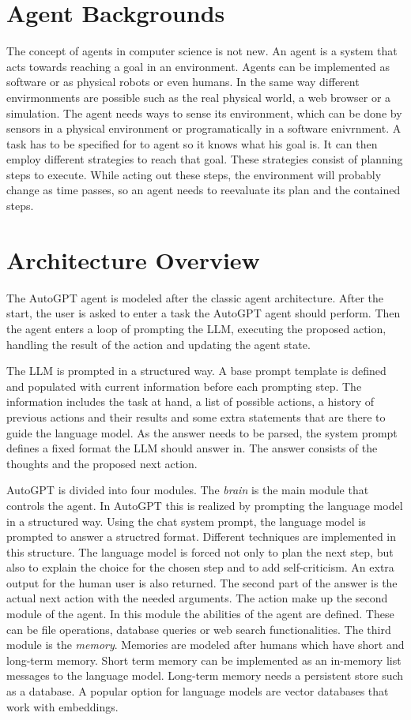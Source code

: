 \documentclass[english, version-2022-01]{uzl-thesis}
\begin{document}
\section{Agent Backgrounds}

The concept of agents in computer science is not new.
An agent is a system that acts towards reaching a goal in an environment.
Agents can be implemented as software or as physical robots or even humans.
In the same way different envirmonments are possible such as the real physical world, a web browser or a simulation.
The agent needs ways to sense its environment, which can be done by sensors in a physical environment or programatically in a software enivrnment.
A task has to be specified for to agent so it knows what his goal is.
It can then employ different strategies to reach that goal. These strategies consist of planning steps to execute.
While acting out these steps, the environment will probably change as time passes, so an agent needs to reevaluate its plan and the contained steps.

\section{Architecture Overview}

The AutoGPT agent is modeled after the classic agent architecture.
After the start, the user is asked to enter a task the AutoGPT agent should perform.
Then the agent enters a loop of prompting the LLM, executing the proposed action, handling the result of the action and updating the agent state.

The LLM is prompted in a structured way.
A base prompt template is defined and populated with current information before each prompting step.
The information includes the task at hand, a list of possible actions, a history of previous actions and their results and some extra statements that are there to guide the language model.
As the answer needs to be parsed, the system prompt defines a fixed format the LLM should answer in.
The answer consists of the thoughts and the proposed next action.


AutoGPT is divided into four modules. The \textit{brain} is the main module that controls the agent.
In AutoGPT this is realized by prompting the language model in a structured way.
Using the chat system prompt, the language model is prompted to answer a structred format.
Different techniques are implemented in this structure.
The language model is forced not only to plan the next step, but also to explain the choice for the chosen step and to add self-criticism.
An extra output for the human user is also returned.
The second part of the answer is the actual next action with the needed arguments.
The action make up the second module of the agent. In this module the abilities of the agent are defined.
These can be file operations, database queries or web search functionalities. The third module is the \textit{memory}.
Memories are modeled after humans which have short and long-term memory.
Short term memory can be implemented as an in-memory list messages to the language model.
Long-term memory needs a persistent store such as a database.
A popular option for language models are vector databases that work with embeddings.
\end{document}
